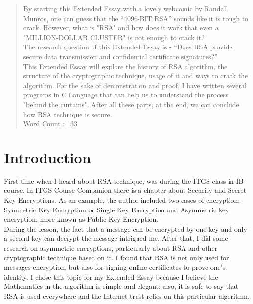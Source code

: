 \documentclass[a4paper, 12pt]{article}
\begin{document}
\begin{abstract}
\label{sec:abstract}

By starting this Extended Essay with a lovely webcomic by Randall Munroe, one can guess that the ``4096-BIT RSA'' sounds like it is tough to crack.
However, what is "RSA" and how does it work that even a "MILLION-DOLLAR CLUSTER" is not enough to crack it?\\
The research question of this Extended Essay is - ``Does RSA provide secure data transmission and confidential certificate signatures?''\\

This Extended Essay will explore the history of RSA
algorithm, the structure of the cryptographic technique, usage of it and ways to crack the algorithm.
For the sake of demonstration and proof, I have written several programs in C Language\cite{Clang} that can help us to understand the process "behind the curtains". After all these parts, at the end, we can conclude how RSA technique is secure.\\

Word Count : 133

\end{abstract}

\section{Introduction}
\label{sec:introduction}

First time when I heard about RSA technique, was during the ITGS class in IB course. In ITGS
Course Companion\cite{itgs} there is a
chapter about Security and Secret Key Encryptions. As an example, the author included two cases
of encryption: Symmetric Key Encryption or Single Key Encryption and Asymmetric key
encryption, more known as Public Key Encryption.\\

During the lesson, the fact that a message can be encrypted by one key and only a second key can
decrypt the message intrigued me. After that, I did some research on asymmetric encryptions,
particularly about RSA and other cryptographic technique based on it. I found that RSA is not only
used for messages encryption, but also for signing online certificates to prove one's identity. I
chose this topic for my Extended Essay because I believe the Mathematics in the algorithm is
simple and elegant; also, it is safe to say that RSA is used everywhere and the Internet trust relies
on this particular algorithm.\\
\end{document}
